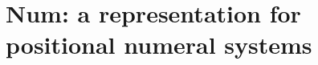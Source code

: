 \documentclass[../thesis.tex]{subfiles}
\begin{document}
\section{Num: a representation for positional numeral systems}\label{representation}

%
%
%
%
%
%
%
%
%
%
\end{document}
